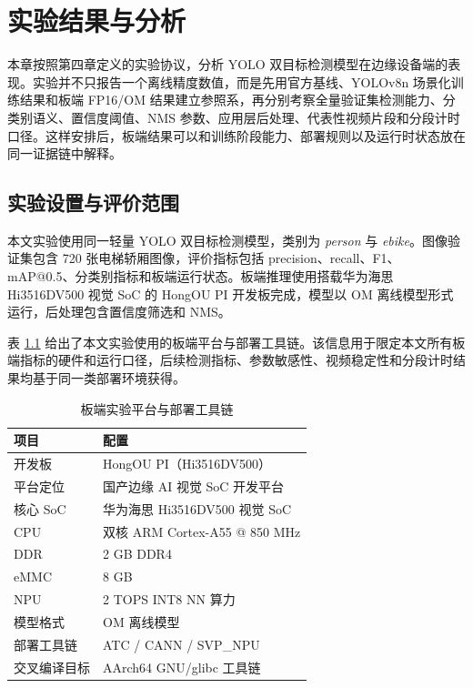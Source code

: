 \chapter{实验结果与分析}
\label{cha:experiments}

本章按照第四章定义的实验协议，分析 YOLO 双目标检测模型在边缘设备端的表现。实验并不只报告一个离线精度数值，而是先用官方基线、YOLOv8n 场景化训练结果和板端 FP16/OM 结果建立参照系，再分别考察全量验证集检测能力、分类别语义、置信度阈值、NMS 参数、应用层后处理、代表性视频片段和分段计时口径。这样安排后，板端结果可以和训练阶段能力、部署规则以及运行时状态放在同一证据链中解释。

\section{实验设置与评价范围}

本文实验使用同一轻量 YOLO 双目标检测模型，类别为 \textit{person} 与 \textit{ebike}。图像验证集包含 720 张电梯轿厢图像，评价指标包括 precision、recall、F1、mAP@0.5、分类别指标和板端运行状态。板端推理使用搭载华为海思 Hi3516DV500 视觉 SoC 的 HongOU PI 开发板完成，模型以 OM 离线模型形式运行，后处理包含置信度筛选和 NMS。

表 \ref{tab:board_platform_specs} 给出了本文实验使用的板端平台与部署工具链。该信息用于限定本文所有板端指标的硬件和运行口径，后续检测指标、参数敏感性、视频稳定性和分段计时结果均基于同一类部署环境获得。

\begin{table}[htbp]
    \centering
    \caption{板端实验平台与部署工具链}
    \label{tab:board_platform_specs}
    \begin{tabular}{p{3.0cm} p{7.6cm}}
        \toprule
        项目 & 配置 \\
        \midrule
        开发板 & HongOU PI（Hi3516DV500） \\
        平台定位 & 国产边缘 AI 视觉 SoC 开发平台 \\
        核心 SoC & 华为海思 Hi3516DV500 视觉 SoC \\
        CPU & 双核 ARM Cortex-A55 @ 850 MHz \\
        DDR & 2 GB DDR4 \\
        eMMC & 8 GB \\
        NPU & 2 TOPS INT8 NN 算力 \\
        模型格式 & OM 离线模型 \\
        部署工具链 & ATC / CANN / SVP\_NPU \\
        交叉编译目标 & AArch64 GNU/glibc 工具链 \\
        \bottomrule
    \end{tabular}
\end{table}

